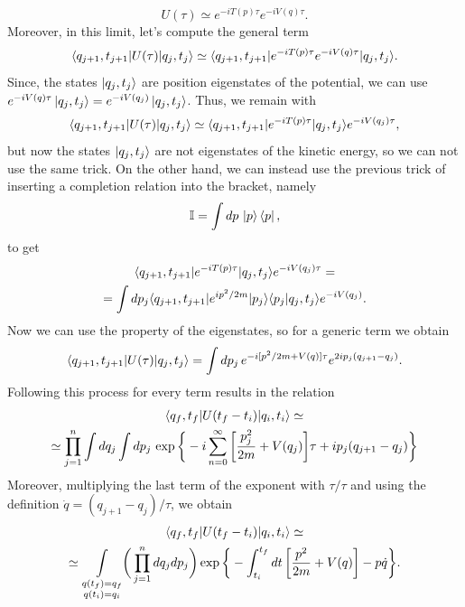 \begin{equation}
    U(\tau) \simeq e^{-iT(p)\tau}e^{-iV(q)\tau}.
\end{equation}
Moreover, in this limit, let's compute the general term 
\begin{equation}
    \langle q_{j+1},t_{j+1} | U(\tau) | q_j,t_j \rangle \simeq \langle q_{j+1},t_{j+1} | e^{-iT(p)\tau}e^{-iV(q)\tau} | q_j,t_j \rangle.
\end{equation}
Since, the states $\ket{q_j,t_j}$ are position eigenstates of the potential, we can use $e^{-iV(q)\tau}\ket{q_j,t_j} = e^{-iV(q_j)}\ket{q_j,t_j}$. Thus, we remain with 
\begin{equation}
    \langle q_{j+1},t_{j+1} | U(\tau) | q_j,t_j \rangle \simeq \langle q_{j+1},t_{j+1} | e^{-iT(p)\tau} | q_j,t_j \rangle e^{-iV(q_j)\tau},
\end{equation}
but now the states $\ket{q_j,t_j}$ are not eigenstates of the kinetic energy, so we can not use the same trick. On the other hand, we can instead use the previous trick of inserting a completion relation into the bracket, namely 
\begin{equation}
    \mathbb{I} = \int dp\,\ket{p}\bra{p},
\end{equation}
to get 
\begin{multline}
    \langle q_{j+1},t_{j+1} | e^{-iT(p)\tau} | q_j,t_j \rangle e^{-iV(q_j)\tau} = \\ 
    = \int dp_j \langle q_{j + 1},t_{j + 1} | e^{ip^2/2m} | p_j \rangle\langle p_j | q_j,t_j \rangle e^{-iV(q_j)}.
\end{multline}
Now we can use the property of the eigenstates, so for a generic term we obtain 
\begin{equation}
    \langle q_{j+1},t_{j+1} | U(\tau) | q_j,t_j \rangle = \int dp_j\,e^{-i[p^2/2m + V(q)]\tau}e^{2ip_j(q_{j + 1} - q_j)}.
\end{equation}
Following this process for every term results in the relation 
\begin{multline}
    \langle q_f,t_f | U(t_f - t_i) | q_i,t_i \rangle \simeq \\ \simeq \prod_{j=1}^n\int dq_j\int dp_j\,\exp{\bigg\{-i\sum_{n=0}^\infty \bigg[\frac{p_j^2}{2m} + V(q_j)\bigg]\tau + ip_j (q_{j + 1} - q_j)\bigg\}}
\end{multline}
Moreover, multiplying the last term of the exponent with $\tau/\tau$ and using the definition $\dot{q} = (q_{j + 1} - q_j)/\tau$, we obtain 
\begin{multline}
    \langle q_f,t_f | U(t_f - t_i) | q_i,t_i \rangle \simeq \\ \simeq \underset{\substack{q(t_f) = q_f \\ q(t_i) = q_i}}{\int}\bigg(\prod_{j=1}^n dq_j dp_j\bigg)\exp{\bigg\{-\int^{t_f}_{t_i}dt\,\bigg[\frac{p^2}{2m} + V(q)\bigg] - p\dot{q}\bigg\}}.
\end{multline}
